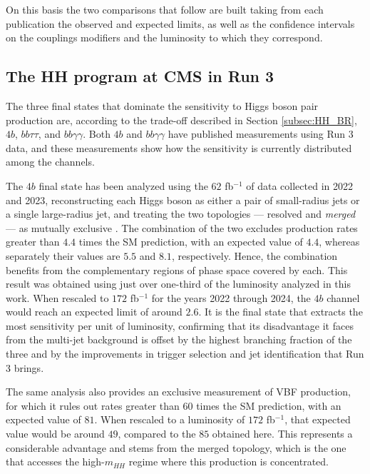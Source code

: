 On this basis the two comparisons that follow are built taking from each publication the observed and expected limits, as well as the confidence intervals on the couplings modifiers and the luminosity to which they correspond.




\subsection{The HH program at CMS in Run 3}
\label{bbtt_comp_cms}
%
The three final states that dominate the sensitivity to Higgs boson pair production are, according to the trade-off described in Section \ref{subsec:HH_BR}, $4b$, $bb\tau\tau$, and $bb\gamma\gamma$. Both $4b$ and $bb\gamma\gamma$ have published measurements using Run 3 data, and these measurements show how the sensitivity is currently distributed among the channels.\medskip

The $4b$ final state has been analyzed using the $62$ fb$^{-1}$ of data collected in 2022 and 2023, reconstructing each Higgs boson as either a pair of small-radius jets or a single large-radius jet, and treating the two topologies --- resolved and \textit{merged} --- as mutually exclusive \cite{CMS:2026znu}. The combination of the two excludes production rates greater than $4.4$ times the SM prediction, with an expected value of $4.4$, whereas separately their values are $5.5$ and $8.1$, respectively. Hence, the combination benefits from the complementary regions of phase space covered by each. This result was obtained using just over one-third of the luminosity analyzed in this work. When rescaled to $172$ fb$^{-1}$ for the years 2022 through 2024, the $4b$ channel would reach an expected limit of around $2.6$. It is the final state that extracts the most sensitivity per unit of luminosity, confirming that its disadvantage it faces from the multi-jet background is offset by the highest branching fraction of the three and by the improvements in trigger selection and jet identification that Run 3 brings.

The same analysis also provides an exclusive measurement of VBF production, for which it rules out rates greater than $60$ times the SM prediction, with an expected value of $81$. When rescaled to a luminosity of $172$ fb$^{-1}$, that expected value would be around $49$, compared to the $85$ obtained here. This represents a considerable advantage and stems from the merged topology, which is the one that accesses the high-$m_{HH}$ regime where this production is concentrated.\medskip

